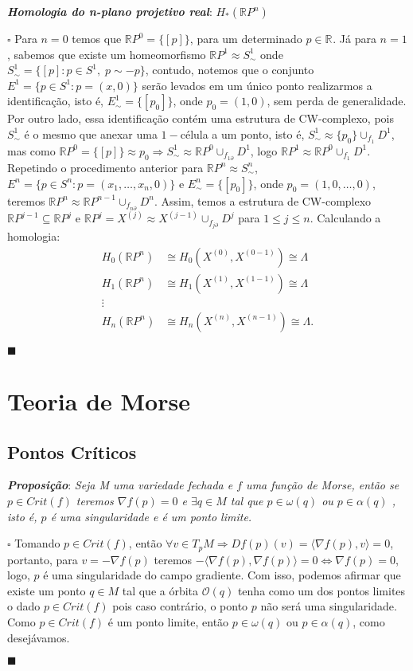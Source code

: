 \documentclass[12pt]{book}
\newcommand{\classe}[1]{[#1]}
\newcommand{\skeleton}[1]{X^{(#1)}}
\newcommand{\homologia}[2]{H_{#1}(#2)}
\newcommand{\homologiarelskelesimpl}[2]{H_{#1}(X^{(#2)}, X^{(#2-1)})}
\newcommand{\real}[1]{\mathbb{R}^{#1}}
\newcommand{\realprojetivo}[1]{\mathbb{R}P^{#1}}
\newcommand{\tese}[3]{\vspace{2mm} \textit{\textbf{#1}}: \textit{#2} \par $\square$ #3 \par $\blacksquare$}
\newcommand{\innerprod}[2]{\langle #1, #2 \rangle}
\begin{document}
	\tese{Homologia do n-plano projetivo real}{$\homologia{*}{\realprojetivo{n}}$}{
	Para $n=0$ temos que $\realprojetivo{0} = \{\classe{p}\}$, para um determinado $p \in \real{}$. Já para $n=1$, sabemos que existe um homeomorfismo $\realprojetivo{1} \approx S^{1}_{\sim}$ onde $S^{1}_{\sim} = \{\classe{p}: p \in S^{1},\; p \sim -p\}$, contudo, notemos que o conjunto $E^{1} = \{p \in S^{1}: p = (x, 0)\}$ serão levados em um único ponto realizarmos a identificação, isto é, $E^{1}_{\sim} = \{\classe{p_{0}}\}$, onde $p_{0} = (1,0)$, sem perda de generalidade. Por outro lado, essa identificação contém uma estrutura de CW-complexo, pois $S^{1}_{\sim}$ é o mesmo que anexar uma $1-$célula a um ponto, isto é, $S^{1}_{\sim} \approx \{p_{0}\} \cup_{f_{1}}D^{1}$, mas como $\realprojetivo{0} =\{\classe{p}\} \approx p_{0} \Rightarrow S^{1}_{\sim} \approx \realprojetivo{0} \cup_{f_{1\partial}}D^{1}$, logo $\realprojetivo{1} \approx \realprojetivo{0} \cup_{f_{1}}D^{1}$. Repetindo o procedimento anterior para $\realprojetivo{n} \approx S^{n}_{\sim} $, $E^{n} = \{p \in S^{n}: p = (x_{1}, \dots, x_{n}, 0)\}$ e $E^{n}_{\sim} = \{\classe{p_{0}}\}$, onde $p_{0} = (1,0,\dots, 0)$, teremos $\realprojetivo{n} \approx \realprojetivo{n-1} \cup_{f_{n\partial}}D^{n}$. Assim, temos a estrutura de CW-complexo $\realprojetivo{j-1} \subseteq \realprojetivo{j}$  e $\realprojetivo{j} = \skeleton{j} \approx \skeleton{j-1}\cup_{f_{j\partial}}D^{j}$ para $1\leq j \leq n$. Calculando a homologia:
	$$
	\begin{aligned}
	\homologia{0}{\realprojetivo{n}} &\cong \homologiarelskelesimpl{0}{0} \cong \Lambda
	\\
	\homologia{1}{\realprojetivo{n}} &\cong \homologiarelskelesimpl{1}{1} \cong \Lambda
	\\
	\vdots
	\\
	\homologia{n}{\realprojetivo{n}} &\cong \homologiarelskelesimpl{n}{n} \cong \Lambda.
	\end{aligned}
	$$
	}
	\chapter{Teoria de Morse}
	\section{Pontos Críticos}
	
	\tese{Proposição}{Seja M uma variedade fechada e $f$ uma função de Morse, então se $p \in Crit(f)$ teremos $\nabla f(p)=0$ e $\exists q \in M$ tal que $p \in \omega(q)$ ou $p \in \alpha(q)$ , isto é, $p$ é uma singularidade e é um ponto limite.}{Tomando $p \in Crit(f)$, então $\forall v \in T_{p}M \Rightarrow Df(p)(v) = \innerprod{\nabla f(p)}{v} = 0$, portanto, para $v = -\nabla f(p)$ teremos $-\innerprod{\nabla f(p)}{\nabla f(p)} = 0 \iff \nabla f(p) = 0$, logo, $p$ é uma singularidade do campo gradiente. Com isso, podemos afirmar que existe um ponto $q \in M$ tal que a órbita $\mathcal{O}(q)$ tenha como um dos pontos limites o dado $p \in Crit(f)$ pois caso contrário, o ponto $p$ não será uma singularidade. Como $p \in Crit(f)$ é um ponto limite, então $p \in \omega(q)$ ou $p \in \alpha(q)$, como desejávamos.}
	
\end{document}
